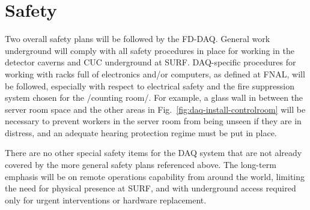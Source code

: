 \section{Safety}
\label{sec:fd-daq-safety}

Two overall safety plans will be followed by the FD-DAQ. General work underground will comply with all safety procedures in place for working in the detector caverns and CUC underground at SURF. DAQ-specific procedures for working with racks full of electronics and/or computers, as defined at FNAL, will be followed, especially with respect to electrical safety and the fire suppression system chosen for the /counting room/. For example, a glass wall in between the server room space and the other areas in Fig.~\ref{fig:daq-install-controlroom} will be necessary to prevent workers in the server room from being unseen if they are in distress, and an adequate hearing protection regime must be put in place.

There are no other special safety items for the DAQ system that are not already covered by the more general safety plans referenced above. The long-term emphasis will be on remote operations capability from around the world, limiting the need for physical presence at SURF, and with underground access required only for urgent interventions or hardware replacement.
